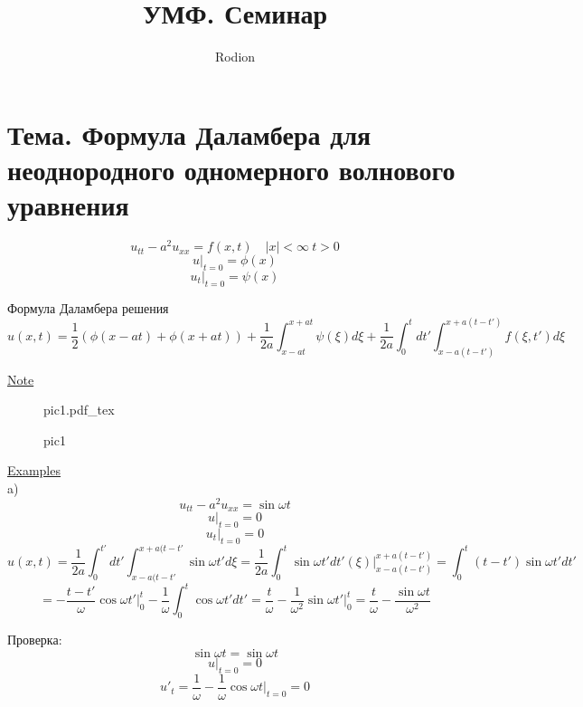 \documentclass[a4paper]{article}
\newcommand{\incfig}[1]{%
\def\svgwidth{\columnwidth}
{#1.pdf_tex}
}
\begin{document}
\title{УМФ. Семинар}
\author{Rodion}
\maketitle

\section*{Тема. Формула Даламбера для неоднородного одномерного волнового уравнения}
\[
    u_{t t} - a^2 u_{xx} = f(x,t) \quad |x| < \infty \ t > 0
\]
\[
    u |_{t=0} = \phi(x)
\]
\[
    u_t |_{t=0} = \psi(x)
\]

Формула Даламбера решения
\[
    u(x,t) = \frac{1}{2} \left(\phi(x-at) + \phi(x+at)\right) + \frac{1}{2a} 
    \int_{x-at}^{x+at} \psi(\xi)d\xi + \frac{1}{2a} \int_{0}^{t} dt'
    \int_{x-a(t-t')}^{x+a(t-t')} f(\xi, t')d\xi
\]

\underline{Note}
\begin{figure}[ht]
    \centering
    \incfig{pic1}
    \caption{pic1}
    \label{fig:pic1}
\end{figure}

\underline{Examples}\\
a) \[
    u_{t t} - a^2 u_{xx} = \sin\omega t
\]
\[
    u |_{t=0} = 0
\]
\[
    u_t |_{t=0} = 0
\]
\[
    u(x,t) = \frac{1}{2a} \int_{0}^{t'} dt' \int_{x-a(t-t'}^{x+a(t-t'} 
    \sin\omega t' d\xi = \frac{1}{2a} \int_{0}^{t} \sin\omega t' dt' (\xi)
    \big|_{x-a(t-t')}^{x + a(t-t')} = \int_{0}^{t}(t-t')\sin\omega t' dt' 
\]
\[
    = -\frac{t-t'}{\omega} \cos\omega t' \big|_{0}^{t} - \frac{1}{\omega} 
    \int_{0}^{t} \cos\omega t' dt' = \frac{t}{\omega} - \frac{1}{\omega^2} 
    \sin\omega t' \big|_0^{t} = \frac{t}{\omega} - \frac{\sin\omega t}{\omega^2} 
\]

Проверка:
\[
    \sin\omega t = \sin\omega t
\]
\[
    u |_{t=0} = 0
\]
\[
    u'_t = \frac{1}{\omega}  - \frac{1}{\omega} \cos\omega t |_{t=0} = 0
\]
\end{document}
